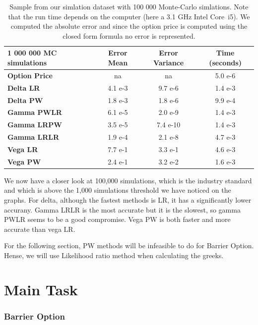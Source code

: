 \documentclass[11pt,a4paper,fleqn,draft]{article}
\begin{document}
\begin{table} [h!]
  \centering
\label{eco:values}
\begin{tabular}{|l|c|c|c|}
\hline
1 000 000 MC simulations      & \textbf{Error Mean} & \textbf{Error Variance} & \textbf{Time (seconds)} \\ \hline
\textbf{Option Price} & na &          na         & 5.0 e-6 \\ \hline
\textbf{Delta LR} & 4.1 e-3 & 9.7 e-6 & 1.4 e-3\\
\textbf{Delta PW} & 1.8 e-3 & 1.8 e-6 & 9.9 e-4\\ \hline
\textbf{Gamma PWLR} & 6.1 e-5 & 2.0 e-9 & 1.4 e-3\\
\textbf{Gamma LRPW} & 3.5 e-5 & 7.4 e-10 & 1.4 e-3\\
\textbf{Gamma LRLR} & 1.9 e-4 & 2.1 e-8 & 4.7 e-3\\ \hline
\textbf{Vega LR} & 7.7 e-1 & 3.3 e-1 & 4.6 e-3\\
\textbf{Vega PW} & 2.4 e-1 & 3.2 e-2 & 1.6 e-3\\ \hline
\end{tabular}

\caption{Sample from our simlation dataset with 100 000 Monte-Carlo simlations. Note that the run time depends on the computer (here a 3.1 GHz Intel Core~i5). We computed the absolute error and since the option price is computed using the closed form formula no error is represented.}

\end{table}

We now have a closer look at 100,000 simulations, which is the industry standard and which is above the 1,000 simulations threshold we have noticed on the graphs.
For delta, although the fastest methods is LR, it has a significantly lower accurany. Gamma LRLR is the most accurate but it is the slowest, so gamma PWLR seems to be a good compromise. Vega PW is both faster and more accurate than vega LR.

For the following section, PW methods will be infeasible to do for Barrier Option. Hense, we will use Likelihood ratio method when calculating the greeks.

\FloatBarrier
\newpage
\part{Main Task}
\section{Barrier Option}
\end{document}

